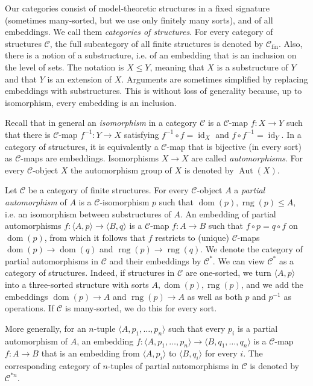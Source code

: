 \documentclass[10pt,a4paper]{article}
\theoremstyle{definition}
\theoremstyle{remark}
\newcommand \seq [1]{\langle #1 \rangle}
\newcommand \maps {\colon} %
\newcommand \id [1]{{\operatorname{id}_{#1}}}
\newcommand \dom {\operatorname{dom}}
\newcommand \rng {\operatorname{rng}}
\newcommand \cmp {\circ} %
\newcommand \C {\mathscr{C}}
\newcommand \fin {{\operatorname{fin}}}
\newcommand \Aut {\operatorname{Aut}}
\begin{document}
Our categories consist of model-theoretic structures in a fixed signature (sometimes many-sorted, but we use only finitely many sorts), and of all embeddings.
We call them \emph{categories of structures}.
For every category of structures $\C$, the full subcategory of all finite structures is denoted by $\C_\fin$.
Also, there is a notion of a substructure, i.e. of an embedding that is an inclusion on the level of sets.
The notation is $X \leq Y$, meaning that $X$ is a substructure of $Y$ and that $Y$ is an extension of $X$.
Arguments are sometimes simplified by replacing embeddings with substructures. This is without loss of generality because, up to isomorphism, every embedding is an inclusion.

Recall that in general an {\it isomorphism} in a category $\C$ is a $\C$-map $f\maps X \to Y$ such that there is $\C$-map $f^{-1}\maps Y \to X$ satisfying $f^{-1} \cmp f = \id{X}$ and $f \cmp f^{-1} = \id{Y}$.
In a category of structures, it is equivalently a $\C$-map that is bijective (in every sort) as $\C$-maps are embeddings.
Isomorphisms $X \to X$ are called {\it automorphisms}.
For every $\C$-object $X$ the automorphism group of $X$ is denoted by $\Aut(X)$.



\medskip

Let $\C$ be a category of finite structures.
For every $\C$-object $A$ a \emph{partial automorphism} of $A$ is a $\C$-isomorphism $p$ such that $\dom(p), \rng(p) \leq A$, i.e. an isomorphism between substructures of $A$.
An embedding of partial automorphisms $f\maps \seq{A,p} \to \seq{B,q}$ is a $\C$-map $f\maps A \to B$ such that $f \cmp p = q \cmp f$ on $\dom(p)$, from which it follows that $f$ restricts to (unique) $\C$-maps $\dom(p) \to \dom(q)$ and $\rng(p) \to \rng(q)$.
We denote the category of partial automorphisms in $\C$ and their embeddings by $\C^*$.
We can view $\C^*$ as a category of structures. Indeed, if structures in $\C$ are one-sorted, we turn $\seq{A,p}$ into a three-sorted structure with sorts $A,\dom(p),\rng(p)$, and we add the embeddings  $\dom(p)\to A$ and $\rng(p) \to A$ as well as both $p$ and $p^{-1}$ as operations. If $\C$ is many-sorted, we do this for every sort.

More generally, for an $n$-tuple   $\seq{A, p_1, \ldots, p_n}$ such that every $p_i$ is a partial automorphism of $A$,  an embedding $f\maps \seq{A, p_1, \ldots, p_n} \to \seq{B, q_1, \ldots, q_n}$ is a $\C$-map $f\maps A \to B$ that is an embedding  from $\seq{A,p_i}$ to $ \seq{B,q_i}$ for every $i$.
The corresponding category of $n$-tuples of partial automorphisms in $\C$ is denoted by $\C^{*n}$.
\end{document}
